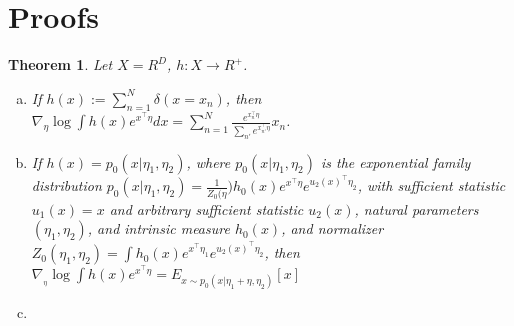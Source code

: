 \documentclass{article}
\newtheorem{theorem}{Theorem}
\begin{document}
\printAffiliationsAndNotice{\icmlEqualContribution} %





\appendix

\section{Proofs}
\label{proofs}

\begin{theorem}
  Let $X = R^D$, $h: X \rightarrow R^{+}$. 
  \begin{enumerate}[(a)]
    \item If $h(x) := \sum_{n=1}^N \delta( x = x_n)$, then 
    $
      \nabla_\eta \log \int h(x) e^{ x^\intercal \eta } dx 
      = \sum_{n=1}^N \frac{ e^{ x_n^\intercal \eta } }{ \sum_{n'} e^{ x_{n'}^\intercal \eta } } x_n 
    $.
    \item If $h(x) = p_0( x \vert \eta_1, \eta_2)$, where $p_0(x \vert \eta_1,\eta_2)$ is the exponential family distribution $p_0(x \vert \eta_1,\eta_2) = \frac{1}{Z_0(\eta}) h_0(x) e^{x^\intercal \eta} e^{u_2(x)^\intercal \eta_2}$, with sufficient statistic $u_1(x) = x$ and arbitrary sufficient statistic $u_2(x)$, natural parameters $(\eta_1,\eta_2)$, and intrinsic measure $h_0(x)$, and normalizer $Z_0(\eta_1,\eta_2) = \int h_0(x) e^{ x^\intercal \eta_1 } e^{ u_2(x)^\intercal \eta_2 }$, then $\nabla_{_\eta} \log \int h(x) e^{ x^\intercal \eta} = E_{x \sim p_0(x \vert \eta_1 + \eta, \eta_2)} \left[ x \right]$
    \item
  \end{enumerate}
  \label{exponential family gradient updates}
\end{theorem}
\end{document}

